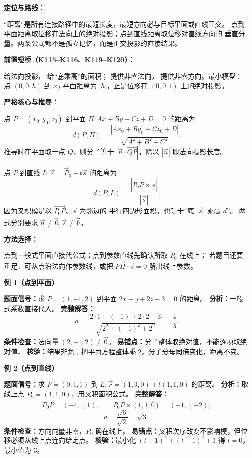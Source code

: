 \begin{knowledgeBox}
\textbf{定位与路线：}

“距离”是所有连接路径中的最短长度，最短方向必与目标平面或直线正交。
点到平面距离取位移在法向上的绝对投影；点到直线距离取位移对直线方向的
垂直分量。两条公式都不是孤立记忆，而是正交投影的直接结果。

\textbf{前置短桥（K115--K116、K119--K120）：}

给法向投影，
给“底乘高”的面积；
提供非零法向，
提供非零方向。最小模型：
点 \((0,0,h)\) 到 \(xy\) 平面距离为 \(|h|\)，正是位移在
\((0,0,1)\) 上的绝对投影。

\textbf{严格核心与推导：}

点 \(P=(x_0,y_0,z_0)\) 到平面
\(\Pi:Ax+By+Cz+D=0\) 的距离为
\[
d(P,\Pi)=\frac{|Ax_0+By_0+Cz_0+D|}
{\sqrt{A^2+B^2+C^2}}.
\]
推导时在平面取一点 \(Q\)，则分子等于
\(|\vec n\cdot\overrightarrow{QP}|\)，除以 \(|\vec n|\) 即法向投影长度。

点 \(P\) 到直线 \(L:\vec r=\vec P_0+t\vec s\) 的距离为
\[
d(P,L)=\frac{|\overrightarrow{P_0P}\times\vec s|}{|\vec s|}.
\]
因为叉积模是以 \(\overrightarrow{P_0P}\)、\(\vec s\) 为邻边的
平行四边形面积，也等于“底 \(|\vec s|\) 乘高 \(d\)”。
两式分别要求 \(\vec n\ne\vec0,\vec s\ne\vec0\)。

\textbf{方法选择：}

点到一般式平面直接代公式；点到参数直线先确认所取 \(P_0\) 在线上；
若题目还要垂足，可从点沿法向作参数线，或把
\(\overrightarrow{PH}\cdot\vec s=0\) 解出线上参数。

\textbf{例 1（点到平面）}

\textbf{题面信号：}求 \(P=(1,-1,2)\) 到平面
\(2x-y+2z-3=0\) 的距离。
\textbf{分析：}一般式系数直接代入。
\textbf{完整解答：}
\[
d=\frac{|2\cdot1-(-1)+2\cdot2-3|}
{\sqrt{2^2+(-1)^2+2^2}}
=\frac43.
\]
\textbf{条件检查：}法向量 \((2,-1,2)\ne\vec0\)。
\textbf{易错点：}分子整体取绝对值，不能逐项取绝对值。
\textbf{核验：}结果非负；把平面方程整体乘 \(2\)，分子分母同倍变化，距离不变。

\textbf{例 2（点到直线）}

\textbf{题面信号：}求 \(P=(0,1,1)\) 到
\(L:\vec r=(1,0,0)+t(1,1,0)\) 的距离。
\textbf{分析：}取线上点 \(P_0=(1,0,0)\)，用叉积面积公式。
\textbf{完整解答：}
\[
\overrightarrow{P_0P}=(-1,1,1),\qquad
\overrightarrow{P_0P}\times(1,1,0)=(-1,1,-2),
\]
\[
d=\frac{\sqrt6}{\sqrt2}=\sqrt3.
\]
\textbf{条件检查：}方向向量非零，\(P_0\) 确在线上。
\textbf{易错点：}叉积次序改变不影响模，但位移必须从线上点连向给定点。
\textbf{核验：}最小化
\((t+1)^2+(t-1)^2+1\) 得 \(t=0\)，最小值为 \(3\)。


\end{knowledgeBox}
